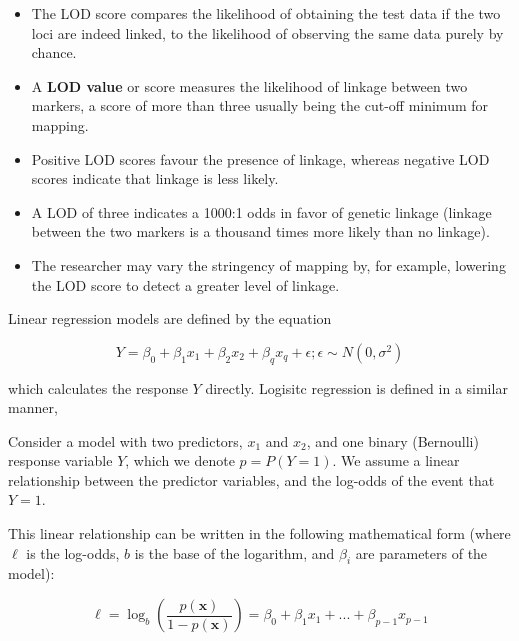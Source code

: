 \documentclass[11pt,dvipsnames,ignorenonframetext,aspectratio=169]{beamer}
\providecommand{\tightlist}{%
  \setlength{\itemsep}{0pt}\setlength{\parskip}{0pt}}
\begin{document}
\begin{frame}{}
\protect\hypertarget{section-1}{}

\begin{itemize}
\tightlist
\item
  The LOD score compares the likelihood of obtaining the test data if
  the two loci are indeed linked, to the likelihood of observing the
  same data purely by chance.
\item
  A \textbf{LOD value} or score measures the likelihood of linkage
  between two markers, a score of more than three usually being the
  cut-off minimum for mapping.
\item
  Positive LOD scores favour the presence of linkage, whereas negative
  LOD scores indicate that linkage is less likely.
\item
  A LOD of three indicates a 1000:1 odds in favor of genetic linkage
  (linkage between the two markers is a thousand times more likely than
  no linkage).
\item
  The researcher may vary the stringency of mapping by, for example,
  lowering the LOD score to detect a greater level of linkage.
\end{itemize}

\end{frame}

\begin{frame}{}
\protect\hypertarget{section-2}{}

Linear regression models are defined by the equation

\[
Y = \beta_0 + \beta_1x_1 + \beta_2x_2 + \beta_qx_q + \epsilon; \epsilon \sim N(0, \sigma^2)
\]

which calculates the response \(Y\) directly. Logisitc regression is
defined in a similar manner,

Consider a model with two predictors, \({\displaystyle x_{1}}\) and
\({\displaystyle x_{2}}\), and one binary (Bernoulli) response variable
\({\displaystyle Y}\), which we denote \({\displaystyle p=P(Y=1)}\). We
assume a linear relationship between the predictor variables, and the
log-odds of the event that \({\displaystyle Y=1}\).

This linear relationship can be written in the following mathematical
form (where \(\ell\) is the log-odds, \(b\) is the base of the
logarithm, and \({\displaystyle \beta _{i}}\) are parameters of the
model):

\[
{\displaystyle \ell =\log _{b}\left({\frac {p(\mathbf{x})}{1-p(\mathbf{x})}}\right)=\beta _{0}+\beta _{1}x_{1}+...+\beta _{p-1}x_{p-1}}
\]

\end{frame}
\end{document}
